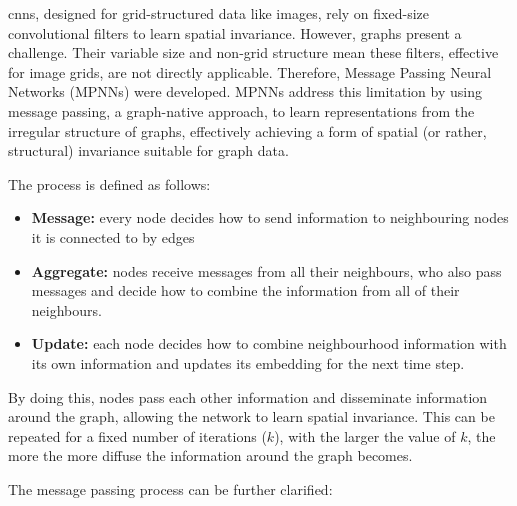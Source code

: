 \documentclass[10pt,oneside]{book}
\begin{document}
\begin{tcolorbox}[title=Message Passing Neural Networks in \glspl*{gnn}]  
\small
    \glspl*{cnn}, designed for grid-structured data like images, rely on fixed-size convolutional filters to learn spatial invariance. However, graphs present a challenge. Their variable size and non-grid structure mean these filters, effective for image grids, are not directly applicable. Therefore, Message Passing Neural Networks (MPNNs) were developed. MPNNs address this limitation by using message passing, a graph-native approach, to learn representations from the irregular structure of graphs, effectively achieving a form of spatial (or rather, structural) invariance suitable for graph data.

    The process is defined as follows:
    \begin{itemize}
        \item {\bf{Message:}} every node decides how to send information to neighbouring nodes it is connected to by edges
        \item {\bf{Aggregate:}} nodes receive messages from all their neighbours, who also pass messages and decide how to combine the information from all of their neighbours. 
        \item {\bf{Update:}} each node decides how to combine neighbourhood information with its own information and updates its embedding for the next time step. 
    \end{itemize}

    By doing this, nodes pass each other information and disseminate information around the graph, allowing the network to learn spatial invariance.  This can be repeated for a fixed number of iterations ($k$), with the larger the value of $k$, the more the more diffuse the information around the graph becomes.

    The message passing process can be further clarified:


\end{tcolorbox}
\end{document}
